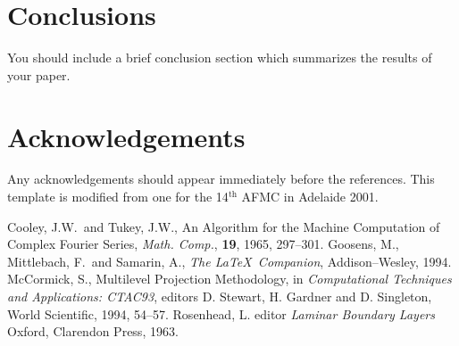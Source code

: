\documentclass[twocolumn]{afmc_art}
\begin{document}
\section{Conclusions}
You should include a brief conclusion section which summarizes the
results of your paper.

\section{Acknowledgements}
Any acknowledgements should appear immediately before the references.
This template is modified from one for the 14$^{\mbox{th}}$ AFMC in 
Adelaide 2001.

\begin{thebibliography}{1}
Cooley, J.W.~and Tukey, J.W., An Algorithm for the Machine Computation 
of Complex Fourier Series, {\em Math. Comp.}, {\bf 19}, 1965, 297--301.
Goosens, M., Mittlebach, F.~and Samarin, A., {\em The \LaTeX\ Companion},
Addison--Wesley, 1994.
McCormick, S., Multilevel Projection Methodology, in {\em Computational
Techniques and Applications: CTAC93}, editors D. Stewart, H. Gardner and 
D. Singleton, World Scientific, 1994, 54--57.
Rosenhead, L. editor {\em Laminar Boundary Layers} Oxford, Clarendon Press, 
1963.
\end{thebibliography}
\end{document}
